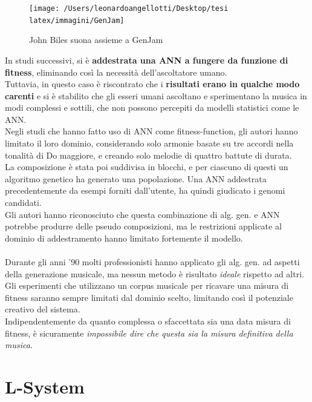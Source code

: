 \documentclass[a4paper,12pt]{report}
\begin{document}
\begin{figure}[H]
    \centering
    \texttt{[image: /Users/leonardoangellotti/Desktop/tesi latex/immagini/GenJam]} 
    \caption{John Biles suona assieme a GenJam}
    \label{fig:immagine}
\end{figure}

In studi successivi, si è \textbf{addestrata una ANN a fungere da funzione di fitness}, eliminando così la necessità dell'ascoltatore umano. \\
Tuttavia, in questo caso è riscontrato che i \textbf{risultati erano in qualche modo carenti} e si è stabilito che gli esseri umani ascoltano e sperimentano la musica in modi complessi e sottili, che non possono percepiti da modelli statistici come le ANN. \\

Negli studi che hanno fatto uso di ANN come fitness-function, gli autori hanno limitato il loro dominio, considerando solo armonie basate su tre accordi nella tonalità di Do maggiore, e creando solo melodie di quattro battute di durata. \\
La composizione è stata poi suddivisa in blocchi, e per ciascuno di questi un algoritmo genetico ha generato una popolazione.
Una ANN addestrata precedentemente da esempi forniti dall'utente, ha quindi giudicato i genomi candidati. \\
Gli autori hanno riconosciuto che questa combinazione di alg. gen. e ANN potrebbe produrre delle pseudo composizioni, 
ma le restrizioni applicate al dominio di addestramento hanno limitato fortemente il modello. \\
\\
Durante gli anni ’90 molti professionisti hanno applicato gli alg. gen. ad aspetti della generazione musicale, ma nessun metodo è risultato \textit{ideale} rispetto ad altri. \\
Gli esperimenti che utilizzano un corpus musicale per ricavare una misura di fitness saranno sempre limitati dal dominio scelto, limitando così il potenziale creativo del sistema. \\
Indipendentemente da quanto complessa o sfaccettata sia una data misura di fitness, è sicuramente \textit{impossibile dire che questa sia la misura definitiva della musica}. 

\section{L-System}
\end{document}
